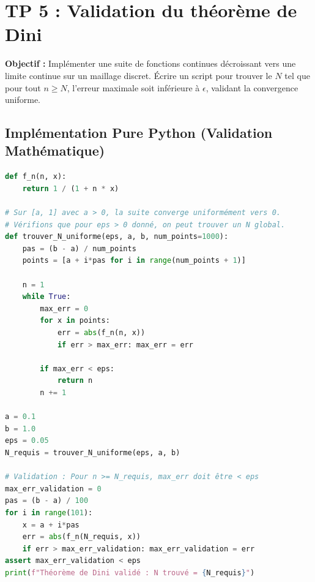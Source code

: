 \documentclass{report}
\begin{document}
\newpage


\chapter*{TP 5 : Validation du théorème de Dini}

\textbf{Objectif :} Implémenter une suite de fonctions continues décroissant vers une limite continue sur un maillage discret. Écrire un script pour trouver le $N$ tel que pour tout $n \geq N$, l'erreur maximale soit inférieure à $\epsilon$, validant la convergence uniforme.

\section*{Implémentation Pure Python (Validation Mathématique)}

\begin{lstlisting}[language=Python]
def f_n(n, x):
    return 1 / (1 + n * x)

# Sur [a, 1] avec a > 0, la suite converge uniformément vers 0.
# Vérifions que pour eps > 0 donné, on peut trouver un N global.
def trouver_N_uniforme(eps, a, b, num_points=1000):
    pas = (b - a) / num_points
    points = [a + i*pas for i in range(num_points + 1)]

    n = 1
    while True:
        max_err = 0
        for x in points:
            err = abs(f_n(n, x))
            if err > max_err: max_err = err

        if max_err < eps:
            return n
        n += 1

a = 0.1
b = 1.0
eps = 0.05
N_requis = trouver_N_uniforme(eps, a, b)

# Validation : Pour n >= N_requis, max_err doit être < eps
max_err_validation = 0
pas = (b - a) / 100
for i in range(101):
    x = a + i*pas
    err = abs(f_n(N_requis, x))
    if err > max_err_validation: max_err_validation = err
assert max_err_validation < eps
print(f"Théorème de Dini validé : N trouvé = {N_requis}")
\end{lstlisting}

\newpage
\end{document}
